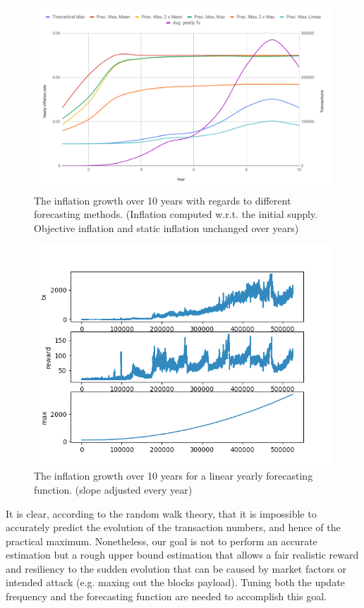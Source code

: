 \documentclass[]{article}
\begin{document}
\begin{figure}[h]
	\includegraphics[width=\linewidth, trim= 0cm 1cm 0cm 1cm, clip]{Figures/expU.png}
	\caption{The inflation growth over 10 years with regards to different forecasting methods. (Inflation computed w.r.t. the initial supply. Objective inflation and static inflation unchanged over years)}
	\label{fig:sim}
\end{figure}

\begin{figure}[]
	\includegraphics[width=\linewidth, trim= 0cm 0cm 0cm 0cm, clip]{Figures/Figure_continuous.png}
	\caption{The inflation growth over 10 years for a linear yearly forecasting function. (slope adjusted every year)}
	\label{fig:sim}
\end{figure}

It is clear, according to the random walk theory, that it is impossible to accurately predict the evolution of the transaction numbers, and hence of the practical maximum. Nonetheless, our goal is not to perform an accurate estimation but a rough upper bound estimation that allows a fair realistic reward and resiliency to the sudden evolution that can be caused by market factors or intended attack (e.g. maxing out the blocks payload). Tuning both the update frequency and the forecasting function are needed to accomplish this goal.
\end{document}
